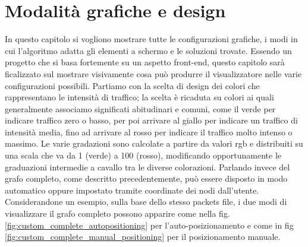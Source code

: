 \documentclass[binding=0.6cm]{sapthesis}
\begin{document}
\section{Modalità grafiche e design}
In questo capitolo si vogliono mostrare tutte le configurazioni grafiche, i modi in cui l'algoritmo adatta gli elementi a schermo e le soluzioni trovate.
Essendo un progetto che si basa fortemente su un aspetto front-end, questo capitolo sarà ficalizzato sul mostrare visivamente cosa può produrre il visualizzatore nelle varie configurazioni possibili.
Partiamo con la scelta di design dei colori che rappresentano le intensità di traffico; la scelta è ricaduta su colori ai quali generalmente associamo significati abitudinari e comuni,
come il verde per indicare traffico zero o basso, per poi arrivare al giallo per indicare un traffico di intensità media, fino ad arrivare al rosso
per indicare il traffico molto intenso o massimo. Le varie gradazioni sono calcolate a partire da valori rgb e distribuiti su una scala che va da 1 (verde) a 100 (rosso), modificando opportunamente le graduazioni intermedie a cavallo tra le diverse colorazioni.
Parlando invece del grafo completo, come descritto precedentemente, può essere disposto in modo automatico oppure impostato tramite coordinate dei nodi dall'utente. 
Considerandone un esempio, sulla base dello stesso packets file, i due modi di visualizzare il grafo completo possono apparire come nella fig. \ref{fig:custom_complete_autopositioning} per l'auto-posizionamento e come in fig \ref{fig:custom_complete_manual_positioning} per il posizionamento manuale.
\end{document}
